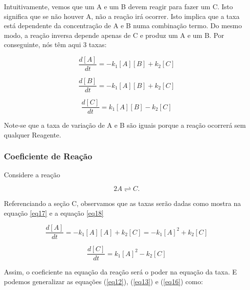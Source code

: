\documentclass[11pt, letterpaper, portuguese]{article}
\begin{document}
    \par{Intuitivamente, vemos que um A e um B devem reagir para fazer um C. Isto significa que se não houver A, não a reação irá ocorrer. Isto implica que a taxa está dependente da concentração de A e B numa combinação
termo. Do mesmo modo, a reação inversa depende apenas de C e produz um A e um B. Por conseguinte, nós têm aqui 3 taxas:
}

    \begin{equation}
        \frac{d [A]}{d t}=-k_1[A][B]+k_2[C]
        \label{eq13}
    \end{equation}

    \begin{equation}
        \frac{d [B]}{d t}=-k_1[A][B]+k_2[C]
        \label{eq14}
    \end{equation}

    \begin{equation}
        \frac{d [C]}{d t}=k_1[A][B]-k_2[C]
    \end{equation}

    \par{Note-se que a taxa de variação de A e B são iguais porque a reação ocorrerá sem qualquer Reagente.} 

    \subsubsection{Coeficiente de Reação}

    \par{Considere a reação}

    \begin{equation}
        2A \rightleftharpoons C.
        \label{eq16}
    \end{equation}

    \par{Referenciando a seção C, observamos que as taxas serão dadas como mostra na equação \ref{eq17} e a equação \ref{eq18}}

    \begin{equation}
        \frac{d [A]}{d t}=-k_1[A][A]+k_2[C]=-k_1{[A]}^2+k_2[C]
        \label{eq17}
    \end{equation}

    \begin{equation}
        \frac{d [C]}{d t}=k_1[A]^2-k_2[C]
        \label{eq18}
    \end{equation}

    \par{Assim, o coeficiente na equação da reação será o poder na equação da taxa. E podemos generalizar as equações (\ref{eq12}), (\ref{eq13}) e (\ref{eq16}) como:}
\end{document}
